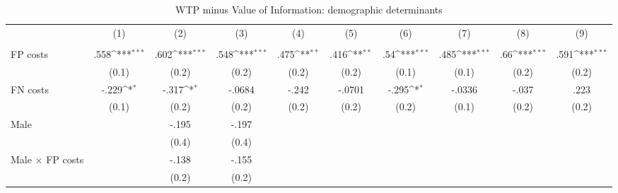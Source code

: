 \begin{table}[htbp]\centering
\def\sym#1{\ifmmode^{#1}\else\(^{#1}\)\fi}
\caption{WTP minus Value of Information: demographic determinants}
\begin{tabular}{l*{9}{c}}
\hline\hline
                &\multicolumn{1}{c}{(1)}&\multicolumn{1}{c}{(2)}&\multicolumn{1}{c}{(3)}&\multicolumn{1}{c}{(4)}&\multicolumn{1}{c}{(5)}&\multicolumn{1}{c}{(6)}&\multicolumn{1}{c}{(7)}&\multicolumn{1}{c}{(8)}&\multicolumn{1}{c}{(9)}\\
                &\multicolumn{1}{c}{}&\multicolumn{1}{c}{}&\multicolumn{1}{c}{}&\multicolumn{1}{c}{}&\multicolumn{1}{c}{}&\multicolumn{1}{c}{}&\multicolumn{1}{c}{}&\multicolumn{1}{c}{}&\multicolumn{1}{c}{}\\
\hline
FP costs        &     .558\sym{***}&     .602\sym{***}&     .548\sym{***}&     .475\sym{**} &     .416\sym{**} &      .54\sym{***}&     .485\sym{***}&      .66\sym{***}&     .591\sym{***}\\
                &    (0.1)         &    (0.2)         &    (0.2)         &    (0.2)         &    (0.2)         &    (0.1)         &    (0.1)         &    (0.2)         &    (0.2)         \\
FN costs        &    -.229\sym{*}  &    -.317\sym{*}  &   -.0684         &    -.242         &   -.0701         &    -.295\sym{*}  &   -.0336         &    -.037         &     .223         \\
                &    (0.1)         &    (0.2)         &    (0.2)         &    (0.2)         &    (0.2)         &    (0.2)         &    (0.1)         &    (0.2)         &    (0.2)         \\
Male            &                  &    -.195         &    -.197         &                  &                  &                  &                  &                  &                  \\
                &                  &    (0.4)         &    (0.4)         &                  &                  &                  &                  &                  &                  \\
Male $\times$ FP costs&                  &    -.138         &    -.155         &                  &                  &                  &                  &                  &                  \\
                &                  &    (0.2)         &    (0.2)         &                  &                  &                  &                  &                  &                  \\

\end{tabular}
\end{table}
